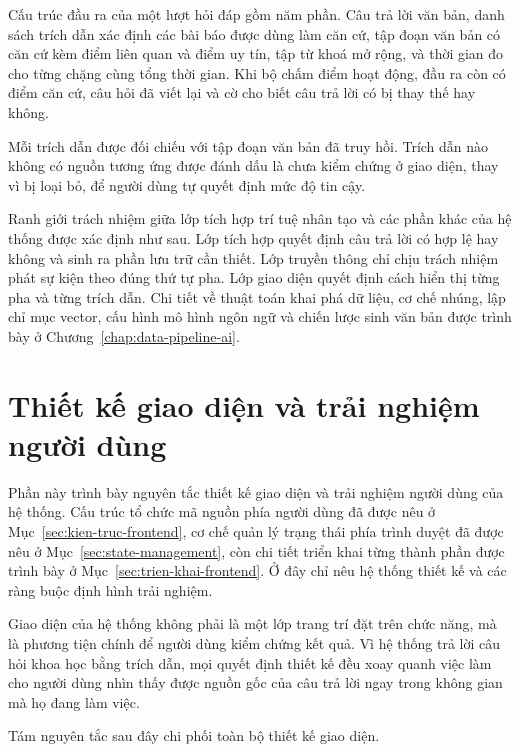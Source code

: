 Cấu trúc đầu ra của một lượt hỏi đáp gồm năm phần. Câu trả lời văn bản, danh sách trích dẫn xác định các bài báo được dùng làm căn cứ, tập đoạn văn bản có căn cứ kèm điểm liên quan và điểm uy tín, tập từ khoá mở rộng, và thời gian đo cho từng chặng cùng tổng thời gian. Khi bộ chấm điểm hoạt động, đầu ra còn có điểm căn cứ, câu hỏi đã viết lại và cờ cho biết câu trả lời có bị thay thế hay không.

Mỗi trích dẫn được đối chiếu với tập đoạn văn bản đã truy hồi. Trích dẫn nào không có nguồn tương ứng được đánh dấu là chưa kiểm chứng ở giao diện, thay vì bị loại bỏ, để người dùng tự quyết định mức độ tin cậy.

Ranh giới trách nhiệm giữa lớp tích hợp trí tuệ nhân tạo và các phần khác của hệ thống được xác định như sau. Lớp tích hợp quyết định câu trả lời có hợp lệ hay không và sinh ra phần lưu trữ cần thiết. Lớp truyền thông chỉ chịu trách nhiệm phát sự kiện theo đúng thứ tự pha. Lớp giao diện quyết định cách hiển thị từng pha và từng trích dẫn. Chi tiết về thuật toán khai phá dữ liệu, cơ chế nhúng, lập chỉ mục vector, cấu hình mô hình ngôn ngữ và chiến lược sinh văn bản được trình bày ở Chương~\ref{chap:data-pipeline-ai}.

\section{Thiết kế giao diện và trải nghiệm người dùng}
\label{sec:ui-ux}

Phần này trình bày nguyên tắc thiết kế giao diện và trải nghiệm người dùng của hệ thống. Cấu trúc tổ chức mã nguồn phía người dùng đã được nêu ở Mục~\ref{sec:kien-truc-frontend}, cơ chế quản lý trạng thái phía trình duyệt đã được nêu ở Mục~\ref{sec:state-management}, còn chi tiết triển khai từng thành phần được trình bày ở Mục~\ref{sec:trien-khai-frontend}. Ở đây chỉ nêu hệ thống thiết kế và các ràng buộc định hình trải nghiệm.

Giao diện của hệ thống không phải là một lớp trang trí đặt trên chức năng, mà là phương tiện chính để người dùng kiểm chứng kết quả. Vì hệ thống trả lời câu hỏi khoa học bằng trích dẫn, mọi quyết định thiết kế đều xoay quanh việc làm cho người dùng nhìn thấy được nguồn gốc của câu trả lời ngay trong không gian mà họ đang làm việc.

Tám nguyên tắc sau đây chi phối toàn bộ thiết kế giao diện.

